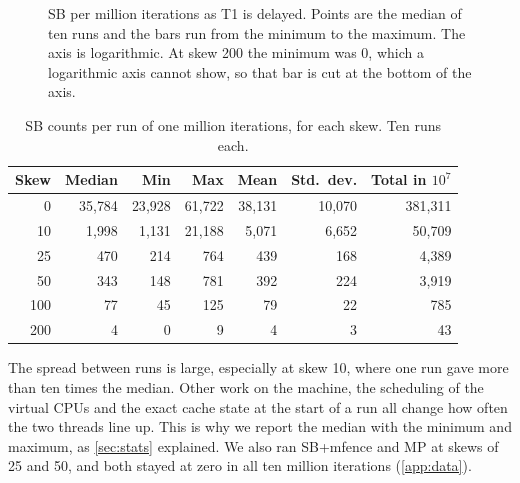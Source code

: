 \begin{figure}[!htbp]
\centering
{}
\caption{SB  per million iterations as T1 is delayed. Points are the median of ten runs and the bars run from the minimum to the maximum. The axis is logarithmic. At skew 200 the minimum was 0, which a logarithmic axis cannot show, so that bar is cut at the bottom of the axis.}
\label{fig:skew}
\end{figure}

\begin{table}[!htbp]
\centering\small
\caption{SB  counts per run of one million iterations, for each skew. Ten runs each.}
\label{tab:skew}
\begin{tabular}{@{}rrrrrrr@{}}
\toprule
Skew & Median & Min & Max & Mean & Std.\ dev. & Total in $10^7$\\
\midrule
0 & 35{,}784 & 23{,}928 & 61{,}722 & 38{,}131 & 10{,}070 & 381{,}311\\
10 & 1{,}998 & 1{,}131 & 21{,}188 & 5{,}071 & 6{,}652 & 50{,}709\\
25 & 470 & 214 & 764 & 439 & 168 & 4{,}389\\
50 & 343 & 148 & 781 & 392 & 224 & 3{,}919\\
100 & 77 & 45 & 125 & 79 & 22 & 785\\
200 & 4 & 0 & 9 & 4 & 3 & 43\\
\bottomrule
\end{tabular}
\end{table}

The spread between runs is large, especially at skew 10, where one run gave more than ten times the median. Other work on the machine, the scheduling of the virtual CPUs and the exact cache state at the start of a run all change how often the two threads line up. This is why we report the median with the minimum and maximum, as \cref{sec:stats} explained. We also ran SB+mfence and MP at skews of 25 and 50, and both stayed at zero in all ten million iterations (\cref{app:data}).

